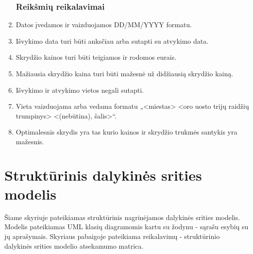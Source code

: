 \documentclass{VUMIFPSkursinis}
\begin{document}
\begin{enumerate}[label=\textbf{NFR\arabic*}.]
					\subsubsection{Reikšmių reikalavimai}
                    	\item Datos įvedamos ir vaizduojamos DD/MM/YYYY formatu.
                    	\item Išvykimo data turi būti anksčiau arba sutapti su atvykimo data.
                    	\item Skrydžio kainos turi būti teigiamos ir rodomos eurais.
                    	\item Mažiausia skrydžio kaina turi būti mažesnė už didžiausią skrydžio kainą.
                    	\item Išvykimo ir atvykimo vietos negali sutapti.
                    	\item Vieta vaizduojama arba vedama formatu „<miestas> <oro uosto trijų raidžių trumpinys> <(nebūtina), šalis>“.
                    	\item \label{optimalus} Optimalesnis skrydis yra tas kurio kainos ir skrydžio trukmės santykis yra mažesnis.
                \end{enumerate}
      
        \section{Struktūrinis dalykinės srities modelis}
            Šiame skyriuje pateikiamas struktūrinis nagrinėjamos dalykinės srities modelis. Modelis pateikiamas UML klasių diagramomis kartu su žodynu - sąrašu esybių su jų aprašymais. Skyriaus pabaigoje pateikiama reikalavimų - struktūrinio dalykinės srities modelio atsekamumo matrica.
\end{document}
